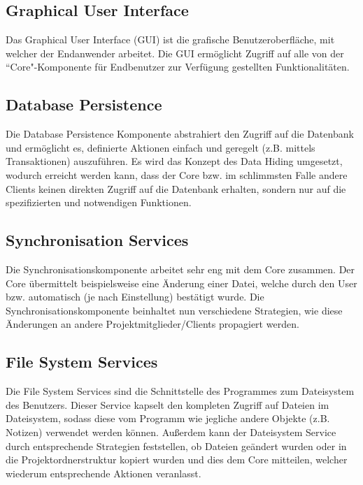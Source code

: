 \subsection{Graphical User Interface}
Das Graphical User Interface (GUI) ist die grafische Benutzeroberfläche, mit welcher der Endanwender arbeitet.
Die GUI ermöglicht Zugriff auf alle von der ``Core"-Komponente für Endbenutzer zur Verfügung gestellten
Funktionalitäten.

\subsection{Database Persistence} %
Die Database Persistence Komponente abstrahiert den Zugriff auf die Datenbank und ermöglicht es, definierte
Aktionen einfach und geregelt (z.B. mittels Transaktionen) %
auszuführen. Es wird das Konzept des Data Hiding umgesetzt, wodurch erreicht werden kann, dass der Core bzw. im schlimmsten Falle andere Clients %
keinen direkten Zugriff auf die Datenbank erhalten, sondern nur auf die spezifizierten und notwendigen Funktionen. %

\subsection{Synchronisation Services}
Die Synchronisationskomponente arbeitet sehr eng mit dem Core zusammen. Der Core übermittelt beispielsweise eine Änderung einer Datei, welche durch den User bzw. automatisch (je nach Einstellung) bestätigt wurde.%
 Die Synchronisationskomponente beinhaltet nun verschiedene Strategien, wie diese Änderungen an andere
Projektmitglieder/Clients propagiert werden. 

\subsection{File System Services}
Die File System Services sind die Schnittstelle des Programmes zum Dateisystem des Benutzers. Dieser Service kapselt den kompleten Zugriff auf Dateien im Dateisystem, sodass diese vom Programm wie jegliche andere Objekte (z.B. Notizen) verwendet werden können. Außerdem kann der Dateisystem Service durch
entsprechende Strategien feststellen, ob Dateien geändert wurden oder in die Projektordnerstruktur kopiert wurden und dies dem Core mitteilen, welcher wiederum entsprechende Aktionen veranlasst.


